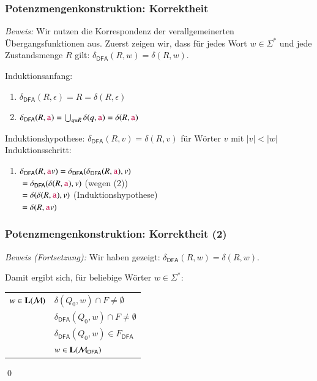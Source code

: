 \documentclass[onlymath,handout]{beamer}
\begin{document}
\begin{frame}[t]\frametitle{Potenzmengenkonstruktion: Korrektheit}


\emph{Beweis:} Wir nutzen die Korrespondenz der verallgemeinerten Übergangsfunktionen aus. Zuerst zeigen wir,
dass für jedes Wort $w\in\Sigma^*$ und jede Zustandsmenge $R$ gilt: $\delta_{\textsf{DFA}}(R,w) = \delta(R,w)$.\pause
\medskip

\alert{Induktionsanfang:}
\begin{enumerate}[(1)]
\item $\delta_{\textsf{DFA}}(R,\epsilon) = R = \delta(R,\epsilon)$\pause
\item $\delta_{\textsf{DFA}}(R,\mathtt{\textcolor{purple}{a}}) = \bigcup_{q\in R}\delta(q,\mathtt{\textcolor{purple}{a}}) = \delta(R,\mathtt{\textcolor{purple}{a}})$\pause
\end{enumerate}\medskip

\alert{Induktionshypothese:} $\delta_{\textsf{DFA}}(R,v) = \delta(R,v)$ für Wörter $v$ mit $|v|<|w|$\\[1ex]
\alert{Induktionsschritt:}
\begin{enumerate}[(3)]
\item $\delta_{\textsf{DFA}}(R,\mathtt{\textcolor{purple}{a}}v) = \delta_{\textsf{DFA}}(\delta_{\textsf{DFA}}(R,\mathtt{\textcolor{purple}{a}}),v)$\\\pause
\hspace{1.58cm}${}= \delta_{\textsf{DFA}}(\delta(R,\mathtt{\textcolor{purple}{a}}),v)$ \hspace{1cm}(wegen (2))\\\pause
\hspace{1.58cm}${}= \delta(\delta(R,\mathtt{\textcolor{purple}{a}}),v)$ \hspace{1.45cm}(Induktionshypothese)\\\pause
\hspace{1.58cm}${}= \delta(R,\mathtt{\textcolor{purple}{a}}v)$
\end{enumerate}

\end{frame}

\begin{frame}[t]\frametitle{Potenzmengenkonstruktion: Korrektheit (2)}


\emph{Beweis (Fortsetzung):} Wir haben gezeigt: $\delta_{\textsf{DFA}}(R,w) = \delta(R,w)$.\pause
\medskip

Damit ergibt sich, für beliebige Wörter $w\in\Sigma^*$:\medskip

\begin{tabular}{l@{~~~ gdw. ~~~}l}
$w\in \textbf{\textcolor{black}{L}}(\mathcal{M})$ & \pause$\delta(Q_0,w)\cap F \neq \emptyset$ \\\pause
	& $\delta_{\textsf{DFA}}(Q_0,w)\cap F \neq \emptyset$ \\\pause
	& $\delta_{\textsf{DFA}}(Q_0,w)\in F_{\textsf{DFA}}$ \\\pause
	& $w\in \textbf{\textcolor{black}{L}}(\mathcal{M}_{\textsf{DFA}})$
\end{tabular}

\qed

\end{frame}
\end{document}
